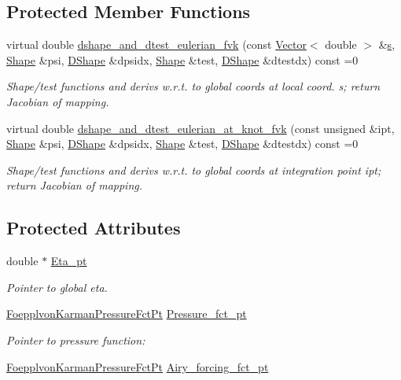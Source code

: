 \subsection*{Protected Member Functions}
\begin{DoxyCompactItemize}
\item 
virtual double \hyperlink{classoomph_1_1FoepplvonKarmanEquations_a59a391262fa8c5ae6313db65cf682ee2}{dshape\+\_\+and\+\_\+dtest\+\_\+eulerian\+\_\+fvk} (const \hyperlink{classoomph_1_1Vector}{Vector}$<$ double $>$ \&\hyperlink{cfortran_8h_ab7123126e4885ef647dd9c6e3807a21c}{s}, \hyperlink{classoomph_1_1Shape}{Shape} \&psi, \hyperlink{classoomph_1_1DShape}{D\+Shape} \&dpsidx, \hyperlink{classoomph_1_1Shape}{Shape} \&test, \hyperlink{classoomph_1_1DShape}{D\+Shape} \&dtestdx) const =0
\begin{DoxyCompactList}\small\item\em Shape/test functions and derivs w.\+r.\+t. to global coords at local coord. s; return Jacobian of mapping. \end{DoxyCompactList}\item 
virtual double \hyperlink{classoomph_1_1FoepplvonKarmanEquations_aab91609ffb4a1ae2ae32ef7cb44f887e}{dshape\+\_\+and\+\_\+dtest\+\_\+eulerian\+\_\+at\+\_\+knot\+\_\+fvk} (const unsigned \&ipt, \hyperlink{classoomph_1_1Shape}{Shape} \&psi, \hyperlink{classoomph_1_1DShape}{D\+Shape} \&dpsidx, \hyperlink{classoomph_1_1Shape}{Shape} \&test, \hyperlink{classoomph_1_1DShape}{D\+Shape} \&dtestdx) const =0
\begin{DoxyCompactList}\small\item\em Shape/test functions and derivs w.\+r.\+t. to global coords at integration point ipt; return Jacobian of mapping. \end{DoxyCompactList}\end{DoxyCompactItemize}
\subsection*{Protected Attributes}
\begin{DoxyCompactItemize}
\item 
double $\ast$ \hyperlink{classoomph_1_1FoepplvonKarmanEquations_a87b07cdd082aeda0e5c1d731328492bf}{Eta\+\_\+pt}
\begin{DoxyCompactList}\small\item\em Pointer to global eta. \end{DoxyCompactList}\item 
\hyperlink{classoomph_1_1FoepplvonKarmanEquations_a39b64f9712ec34f455beb9f4271ff297}{Foepplvon\+Karman\+Pressure\+Fct\+Pt} \hyperlink{classoomph_1_1FoepplvonKarmanEquations_ac1d9616b1faf6b16e1614e12aa07a028}{Pressure\+\_\+fct\+\_\+pt}
\begin{DoxyCompactList}\small\item\em Pointer to pressure function\+: \end{DoxyCompactList}\item 
\hyperlink{classoomph_1_1FoepplvonKarmanEquations_a39b64f9712ec34f455beb9f4271ff297}{Foepplvon\+Karman\+Pressure\+Fct\+Pt} \hyperlink{classoomph_1_1FoepplvonKarmanEquations_ae30745c66511b2bd1beeda30050814d7}{Airy\+\_\+forcing\+\_\+fct\+\_\+pt}
\end{DoxyCompactItemize}
